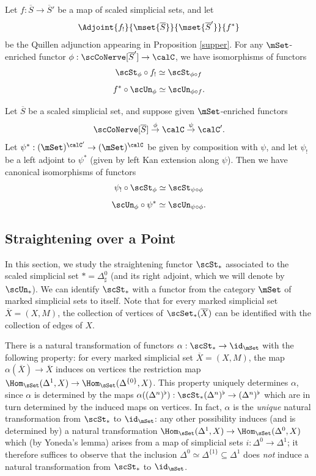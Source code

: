 \begin{remark}\label{ba1}
Let $f: \overline{S} \rightarrow \overline{S}'$ be a map of scaled simplicial sets, and let
$$ \Adjoint{f_!}{\mset{\overline{S}}}{\mset{\overline{S}'}}{f^{\ast}}$$ be the Quillen adjunction appearing in Proposition \ref{supper}. For any $\mSet$-enriched functor $\phi: \scCoNerve[\overline{S}'] \rightarrow \calC$, we have isomorphisms of functors
$$ \scSt_{ \phi} \circ f_{!} \simeq \scSt_{ \phi \circ f}$$
$$ f^{\ast} \circ \scUn_{\phi} \simeq \scUn_{ \phi \circ f}.$$
\end{remark}

\begin{remark}\label{ba2}
Let $\overline{S}$ be a scaled simplicial set, and suppose given
$\mSet$-enriched functors
$$ \scCoNerve[ \overline{S} ] \stackrel{ \phi}{\rightarrow} \calC
\stackrel{ \psi}{\rightarrow} \calC'. $$
Let $\psi^{\ast}: (\mSet)^{\calC'} \rightarrow (\mSet)^{\calC}$ be given by composition with
$\psi$, and let $\psi_{!}$ be a left adjoint to $\psi^{\ast}$ (given by left Kan extension along $\psi$). 
Then we have canonical isomorphisms of functors
$$ \psi_{!} \circ \scSt_{\phi} \simeq \scSt_{ \psi \circ \phi }$$
$$ \scUn_{\phi} \circ \psi^{\ast} \simeq \scUn_{ \psi \circ \phi }.$$
\end{remark}

\subsection{Straightening over a Point}\label{bisec3.4}

In this section, we study the straightening functor $\scSt_{\ast}$ associated to the scaled simplicial set $\ast = \Delta^0_{\sharp}$ (and its right adjoint, which we will denote by $\scUn_{\ast}$). We can identify $\scSt_{\ast}$ with a functor from the category $\mSet$ of marked simplicial sets to itself. Note that for every marked simplicial set $\overline{X} = (X,M)$, the collection of vertices of $\scSet_{\ast}( \overline{X} )$ can be identified with the collection of edges of $X$.

There is a natural transformation of functors $\alpha: \scSt_{\ast} \rightarrow \id_{\mSet}$ with the following property: for every marked simplicial set $\overline{X} = (X,M)$, the map
$\alpha( \overline{X} ) \rightarrow \overline{X}$ induces on vertices the restriction map
$\Hom_{\sSet}( \Delta^1, X) \rightarrow \Hom_{\sSet}( \Delta^{\{0\}}, X)$. This property
uniquely determines $\alpha$, since $\alpha$ is determined by the maps
$\alpha( ( \Delta^n)^{\flat} ): \scSt_{\ast} (\Delta^n)^{\flat} \rightarrow (\Delta^n)^{\flat}$
which are in turn determined by the induced maps on vertices. In fact, $\alpha$ is the
{\em unique} natural transformation from $\scSt_{\ast}$ to $\id_{\mSet}$: any other possibility induces (and is determined by) a natural transformation
$\Hom_{\sSet}( \Delta^1, X) \rightarrow \Hom_{\sSet}( \Delta^0, X)$ which
(by Yoneda's lemma) arises from a map of simplicial sets $i: \Delta^{0} \rightarrow \Delta^1$; it therefore suffices to observe that the inclusion $\Delta^{0} \simeq \Delta^{ \{1\} } \subseteq \Delta^1$ does
{\em not} induce a natural transformation from $\scSt_{\ast}$ to $\id_{\mSet}$.

